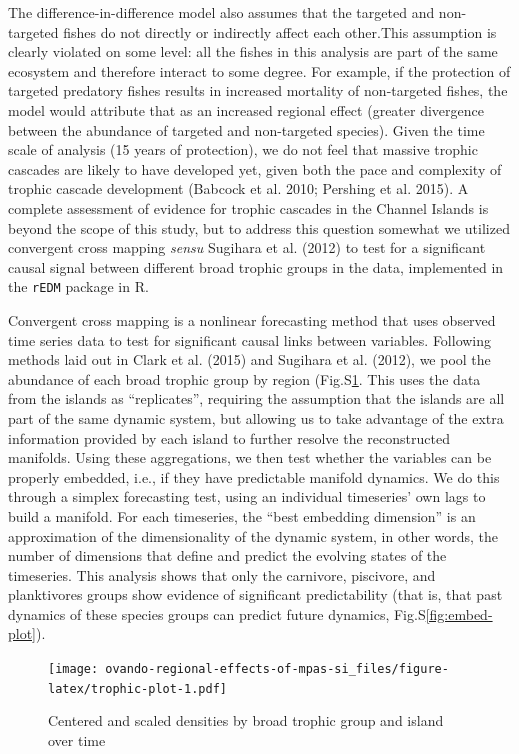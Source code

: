\documentclass[]{article}
\begin{document}
The difference-in-difference model also assumes that the targeted and non-targeted fishes do not directly or indirectly affect each other.This assumption is clearly violated on some level: all the fishes in this analysis are part of the same ecosystem and therefore interact to some degree. For example, if the protection of targeted predatory fishes results in increased mortality of non-targeted fishes, the model would attribute that as an increased regional effect (greater divergence between the abundance of targeted and non-targeted species). Given the time scale of analysis (15 years of protection), we do not feel that massive trophic cascades are likely to have developed yet, given both the pace and complexity of trophic cascade development (Babcock et al. 2010; Pershing et al. 2015). A complete assessment of evidence for trophic cascades in the Channel Islands is beyond the scope of this study, but to address this question somewhat we utilized convergent cross mapping \emph{sensu} Sugihara et al. (2012) to test for a significant causal signal between different broad trophic groups in the data, implemented in the \texttt{rEDM} package in R.

Convergent cross mapping is a nonlinear forecasting method that uses observed time series data to test for significant causal links between variables. Following methods laid out in Clark et al. (2015) and Sugihara et al. (2012), we pool the abundance of each broad trophic group by region (Fig.S\ref{fig:trophic-plot}. This uses the data from the islands as ``replicates'', requiring the assumption that the islands are all part of the same dynamic system, but allowing us to take advantage of the extra information provided by each island to further resolve the reconstructed manifolds. Using these aggregations, we then test whether the variables can be properly embedded, i.e., if they have predictable manifold dynamics. We do this through a simplex forecasting test, using an individual timeseries' own lags to build a manifold. For each timeseries, the ``best embedding dimension'' is an approximation of the dimensionality of the dynamic system, in other words, the number of dimensions that define and predict the evolving states of the timeseries. This analysis shows that only the carnivore, piscivore, and planktivores groups show evidence of significant predictability (that is, that past dynamics of these species groups can predict future dynamics, Fig.S\ref{fig:embed-plot}).

\begin{figure}
\centering
\texttt{[image: ovando-regional-effects-of-mpas-si\_files/figure-latex/trophic-plot-1.pdf]}
\caption{\label{fig:trophic-plot}Centered and scaled densities by broad trophic group and island over time}
\end{figure}
\end{document}
